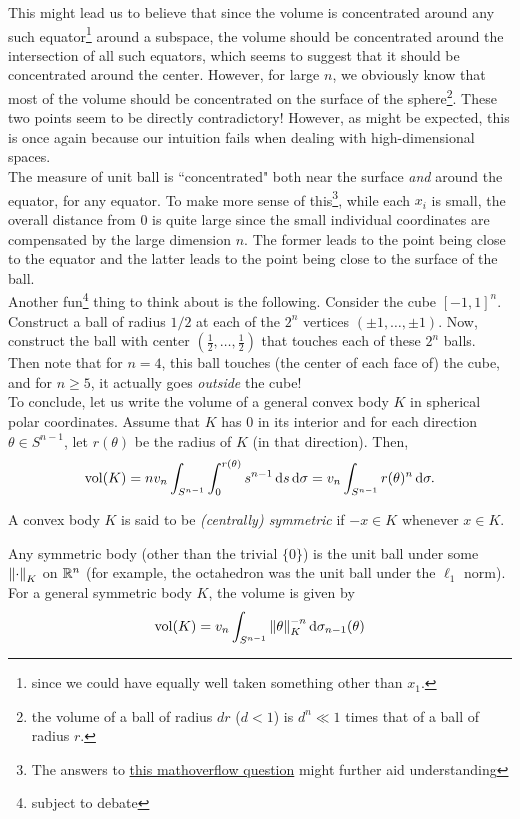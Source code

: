 This might lead us to believe that since the volume is concentrated around any such equator\footnote{since we could have equally well taken something other than $x_1$.} around a subspace, the volume should be concentrated around the intersection of all such equators, which seems to suggest that it should be concentrated around the center. However, for large $n$, we obviously know that most of the volume should be concentrated on the surface of the sphere\footnote{the volume of a ball of radius $dr$ ($d<1$) is $d^n\ll 1$ times that of a ball of radius $r$.}. These two points seem to be directly contradictory! However, as might be expected, this is once again because our intuition fails when dealing with high-dimensional spaces.\\
The measure of unit ball is ``concentrated" both near the surface \textit{and} around the equator, for any equator. To make more sense of this\footnote{The answers to \href{https://mathoverflow.net/questions/210291/how-to-explain-the-concentration-of-measure-phenomenon-intuitively}{this mathoverflow question} might further aid understanding}, while each $x_i$ is small, the overall distance from $0$ is quite large since the small individual coordinates are compensated by the large dimension $n$. The former leads to the point being close to the equator and the latter leads to the point being close to the surface of the ball.\\

Another fun\footnote{subject to debate} thing to think about is the following. Consider the cube $[-1,1]^n$. Construct a ball of radius $1/2$ at each of the $2^n$ vertices $(\pm 1,\ldots, \pm 1)$. Now, construct the ball with center $(\frac{1}{2},\ldots,\frac{1}{2})$ that touches each of these $2^n$ balls. Then note that for $n=4$, this ball touches (the center of each face of) the cube, and for $n\geq 5$, it actually goes \textit{outside} the cube!\\

To conclude, let us write the volume of a general convex body $K$ in spherical polar coordinates. Assume that $K$ has $0$ in its interior and for each direction $\theta\in S^{n-1}$, let $r(\theta)$ be the radius of $K$ (in that direction). Then,
\[
\operatorname{vol}(K) = nv_n \int_{S^{n-1}}\int_0^{r(\theta)}s^{n-1}\operatorname{d}\!{s}\operatorname{d}\!{\sigma} = v_n\int_{S^{n-1}} r(\theta)^n\operatorname{d}\!{\sigma}.
\]

\begin{definition}
A convex body $K$ is said to be \textit{(centrally) symmetric} if $-x\in K$ whenever $x\in K$.
\end{definition}
Any symmetric body (other than the trivial $\{0\}$) is the unit ball under some $\left\lVert\cdot\right\rVert_K$ on $\mathbb{R}^n$ (for example, the octahedron was the unit ball under the $\ell_1$ norm). For a general symmetric body $K$, the volume is given by
\begin{equation}
\label{eqn volume in terms of body's norm}
    \operatorname{vol}(K) = v_n\int_{S^{n-1}} \left\lVert\theta\right\rVert_K^{-n} \operatorname{d}\!{\sigma}_{n-1}(\theta)
\end{equation}

